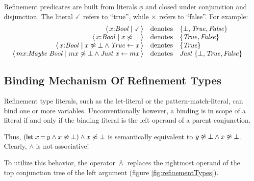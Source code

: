 Refinement predicates are built from literals $\phi$ and closed under conjunction and disjunction.
The literal $\true$ refers to ``true'', while $\times$ refers to ``false''. For example:
$$
	\begin{array}{rcl}
		\reft{ x{:}\ensuremath{\Conid{Bool}}}{ \true }                                                                                                           & \text{denotes} & \{ \bot, \ensuremath{\Conid{True}}, \ensuremath{\Conid{False}} \}                       \\
		\reft{ x{:}\ensuremath{\Conid{Bool}}}{ x \ntermeq \bot }                                                                                                 & \text{denotes} & \{ \ensuremath{\Conid{True}}, \ensuremath{\Conid{False}} \}                             \\
		\reft{ x{:}\ensuremath{\Conid{Bool}}}{ x \ntermeq \bot \wedge \ctcon{\ensuremath{\Conid{True}}}{x} }                                                     & \text{denotes} & \{ \ensuremath{\Conid{True}} \}                                                         \\
		\reft{ mx{:}\ensuremath{\Conid{Maybe}\;\Conid{Bool}}}{ mx \ntermeq \bot \wedge \ctcon{\ensuremath{\Conid{Just}\;\Varid{x}}}{mx}  } & \text{denotes} & \ensuremath{\Conid{Just}\;}\{ \ensuremath{\bot}, \ensuremath{\Conid{True}}, \ensuremath{\Conid{False}} \} \\
	\end{array}
$$

\subsection{Binding Mechanism Of Refinement Types}\label{chap:bckgrndRefinementTypesBinding}

Refinement type literals, such as the let-literal or the pattern-match-literal, can bind one or more variables.
Unconventionally however, a binding is in scope of a literal if and only if
the binding literal is the left operand of a parent conjunction.

Thus, $(\textsf{let}\;x\,\textsf{=}\,y \land x \not\approx \bot) \land x \not\approx \bot$ is semantically equivalent to $y \not\approx \bot \land x \not\approx \bot$.
Clearly, $\land$ is not associative!

To utilize this behavior, the operator $\,\dot{\wedge}\,$ replaces the rightmost operand of the top conjunction tree of the left argument (figure \ref{fig:refinementTypes}).

